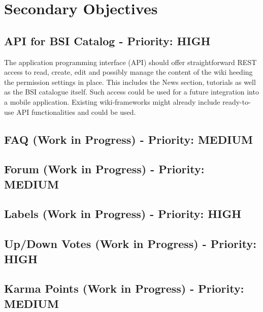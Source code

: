\chapter{Secondary Objectives}
\section{API for BSI Catalog - Priority: HIGH}
The application programming interface (API) should offer straightforward REST access to read, create, edit and possibly manage the content of the wiki heeding the permission settings in place.
This includes the News section, tutorials as well as the BSI catalogue itself.
Such access could be used for a future integration into a mobile application.
Existing wiki-frameworks might already include ready-to-use API functionalities and could be used.


\section{FAQ (Work in Progress) - Priority: MEDIUM}



\section{Forum (Work in Progress) - Priority: MEDIUM}



\section{Labels (Work in Progress) - Priority: HIGH}



\section{Up/Down Votes (Work in Progress) - Priority: HIGH}



\section{Karma Points (Work in Progress) - Priority: MEDIUM}




